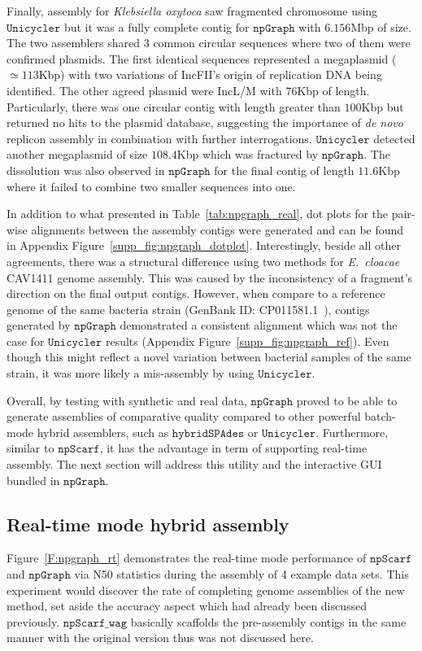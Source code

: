 \documentclass[10pt,twocolumn,twoside]{genpaper}
\newcommand{\npscarf}{$\mathtt{npScarf}$}
\newcommand{\npscarfg}{$\mathtt{npScarf\_wag}$}
\newcommand{\npgraph}{$\mathtt{npGraph}$}
\newcommand{\unicycler}{$\mathtt{Unicycler}$}
\begin{document}
Finally, assembly for \emph{Klebsiella oxytoca} saw fragmented chromosome using \unicycler{} but it was a fully complete contig for \npgraph{} with $6.156$Mbp of size.
The two assemblers shared 3 common circular sequences where two of them were confirmed plasmids. 
The first identical sequences represented a megaplasmid ($\simeq 113$Kbp) with two variations of IncFII's origin of replication DNA being identified. 
The other agreed plasmid were IncL/M with $76$Kbp of length.
Particularly, there was one circular contig with length greater than $100$Kbp but returned no hits to the plasmid database, suggesting the importance of \emph{de novo} replicon assembly in combination with further interrogations.
\unicycler{} detected another megaplasmid of size $108.4$Kbp which was fractured by \npgraph{}. 
The dissolution was also observed in \npgraph{} for the final contig of length $11.6$Kbp where it failed to combine two smaller sequences into one.

In addition to what presented in Table~\ref{tab:npgraph_real}, dot plots for the pair-wise alignments between the assembly contigs were generated and can be found in Appendix Figure~\ref{supp_fig:npgraph_dotplot}. Interestingly, beside all other agreements, there was a structural difference using two methods for \emph{E.~cloacae} CAV1411 genome assembly. This was caused by the inconsistency of a fragment's direction on the final output contigs. However, when compare to a reference genome of the same bacteria strain (GenBank ID: CP011581.1~\cite{Potter2016rapid}), contigs generated by \npgraph{} demonstrated a consistent alignment which was not the case for \unicycler{} results (Appendix Figure~\ref{supp_fig:npgraph_ref}). Even though this might reflect a novel variation between bacterial samples of the same strain, it was more likely a mis-assembly by using \unicycler{}.

Overall, by testing with synthetic and real data, \npgraph{} proved to be able to generate assemblies of comparative quality compared to other powerful batch-mode hybrid assemblers, such as $\mathtt{hybridSPAdes}$ or \unicycler{}.
Furthermore, similar to \npscarf{}, it has the advantage in term of supporting real-time assembly. The next section will address this utility and the interactive GUI bundled in \npgraph{}. 

\subsection*{Real-time mode hybrid assembly}
Figure~\ref{F:npgraph_rt} demonstrates the real-time mode performance of \npscarf{} and \npgraph{} via N50 statistics during the assembly of 4 example data sets.
This experiment would discover the rate of completing genome assemblies of the new method, set aside the accuracy aspect which had already been discussed previously.
\npscarfg{} basically scaffolds the pre-assembly contigs in the same manner with the original version thus was not discussed here.
\end{document}
